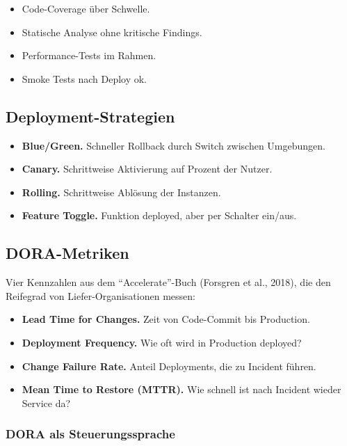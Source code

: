 \documentclass[11pt,a4paper,oneside]{article}
\newcommand{\fachbegriff}[1]{\textbf{#1}}
\begin{document}
\begin{itemize}
  \item Code-Coverage über Schwelle.
  \item Statische Analyse ohne kritische Findings.
  \item Performance-Tests im Rahmen.
  \item Smoke Tests nach Deploy ok.
\end{itemize}

\subsection{Deployment-Strategien}

\begin{itemize}
  \item \fachbegriff{Blue/Green.} Schneller Rollback durch Switch zwischen Umgebungen.
  \item \fachbegriff{Canary.} Schrittweise Aktivierung auf Prozent der Nutzer.
  \item \fachbegriff{Rolling.} Schrittweise Ablösung der Instanzen.
  \item \fachbegriff{Feature Toggle.} Funktion deployed, aber per Schalter ein/aus.
\end{itemize}

\subsection{DORA-Metriken}

Vier Kennzahlen aus dem ``Accelerate''-Buch (Forsgren et al., 2018), die den Reifegrad von Liefer-Organisationen messen:

\begin{itemize}
  \item \fachbegriff{Lead Time for Changes.} Zeit von Code-Commit bis Production.
  \item \fachbegriff{Deployment Frequency.} Wie oft wird in Production deployed?
  \item \fachbegriff{Change Failure Rate.} Anteil Deployments, die zu Incident führen.
  \item \fachbegriff{Mean Time to Restore (MTTR).} Wie schnell ist nach Incident wieder Service da?
\end{itemize}

\subsubsection{DORA als Steuerungssprache}
\end{document}
